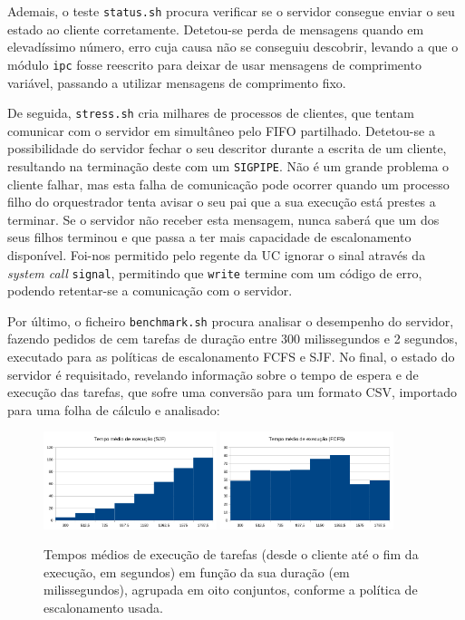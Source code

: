\documentclass[11pt]{article}
\begin{document}
Ademais, o teste \texttt{status.sh} procura verificar se o servidor consegue enviar o seu estado ao
cliente corretamente. Detetou-se perda de mensagens quando em elevadíssimo número, erro cuja causa
não se conseguiu descobrir, levando a que o módulo \texttt{ipc} fosse reescrito para deixar de usar
mensagens de comprimento variável, passando a utilizar mensagens de comprimento fixo.

De seguida, \texttt{stress.sh} cria milhares de processos de clientes, que tentam comunicar com o
servidor em simultâneo pelo FIFO partilhado. Detetou-se a possibilidade do servidor fechar o seu
descritor durante a escrita de um cliente, resultando na terminação deste com um \texttt{SIGPIPE}.
Não é um grande problema o cliente falhar, mas esta falha de comunicação pode ocorrer quando um
processo filho do orquestrador tenta avisar o seu pai que a sua execução está prestes a terminar.
Se o servidor não receber esta mensagem, nunca saberá que um dos seus filhos terminou e que passa a
ter mais capacidade de escalonamento disponível. Foi-nos permitido pelo regente da UC ignorar o
sinal através da \emph{system call} \texttt{signal}, permitindo que \texttt{write} termine com um
código de erro, podendo retentar-se a comunicação com o servidor.

Por último, o ficheiro \texttt{benchmark.sh} procura analisar o desempenho do servidor, fazendo
pedidos de cem tarefas de duração entre 300 milissegundos e 2 segundos, executado para as políticas
de escalonamento FCFS e SJF. No final, o estado do servidor é requisitado, revelando informação
sobre o tempo de espera e de execução das tarefas, que sofre uma conversão para um formato CSV,
importado para uma folha de cálculo e analisado:

\begin{figure}[H]
    \centering
    \includegraphics[width=0.45\textwidth]{report_figures/HistogramSJF.png}
    \includegraphics[width=0.45\textwidth]{report_figures/HistogramFCFS.png}
    \caption{Tempos médios de execução de tarefas (desde o cliente até o fim da execução, em
        segundos) em função da sua duração (em milissegundos), agrupada em oito conjuntos, conforme
        a política de escalonamento usada.}
\end{figure}
\end{document}
